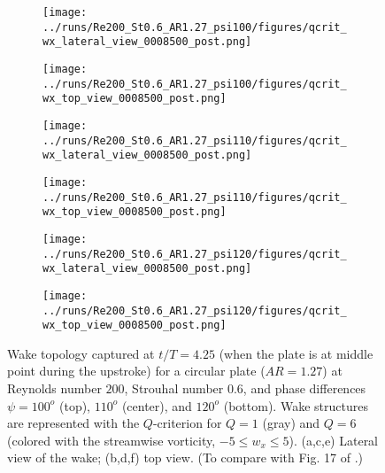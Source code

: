\begin{figure}
  \centering
  \begin{subfigure}[]{0.45\textwidth}
    \centering
    \texttt{[image: ../runs/Re200\_St0.6\_AR1.27\_psi100/figures/qcrit\_wx\_lateral\_view\_0008500\_post.png]}
    \caption{}
  \end{subfigure}
  \hfill
  \begin{subfigure}[]{0.45\textwidth}
    \centering
    \texttt{[image: ../runs/Re200\_St0.6\_AR1.27\_psi100/figures/qcrit\_wx\_top\_view\_0008500\_post.png]}
    \caption{}
  \end{subfigure}
  \vspace{1cm}
  \begin{subfigure}[]{0.45\textwidth}
    \centering
    \texttt{[image: ../runs/Re200\_St0.6\_AR1.27\_psi110/figures/qcrit\_wx\_lateral\_view\_0008500\_post.png]}
    \caption{}
  \end{subfigure}
  \hfill
  \begin{subfigure}[]{0.45\textwidth}
    \centering
    \texttt{[image: ../runs/Re200\_St0.6\_AR1.27\_psi110/figures/qcrit\_wx\_top\_view\_0008500\_post.png]}
    \caption{}
  \end{subfigure}
  \vspace{1cm}
  \begin{subfigure}[]{0.45\textwidth}
    \centering
    \texttt{[image: ../runs/Re200\_St0.6\_AR1.27\_psi120/figures/qcrit\_wx\_lateral\_view\_0008500\_post.png]}
    \caption{}
  \end{subfigure}
  \hfill
  \begin{subfigure}[]{0.45\textwidth}
    \centering
    \texttt{[image: ../runs/Re200\_St0.6\_AR1.27\_psi120/figures/qcrit\_wx\_top\_view\_0008500\_post.png]}
    \caption{}
  \end{subfigure}
  \caption{Wake topology captured at $t / T = 4.25$ (when the plate is at middle point during the upstroke) for a circular plate ($AR = 1.27$) at Reynolds number $200$, Strouhal number $0.6$, and phase differences $\psi = 100^o$ (top), $110^o$ (center), and $120^o$ (bottom). Wake structures are represented with the $Q$-criterion for $Q = 1$ (gray) and $Q = 6$ (colored with the streamwise vorticity, $-5 \leq w_x \leq 5$). (a,c,e) Lateral view of the wake; (b,d,f) top view. (To compare with Fig. 17 of \citet{li_dong_2016}.)}
  \label{fig:phase_wake_topology}
\end{figure}

